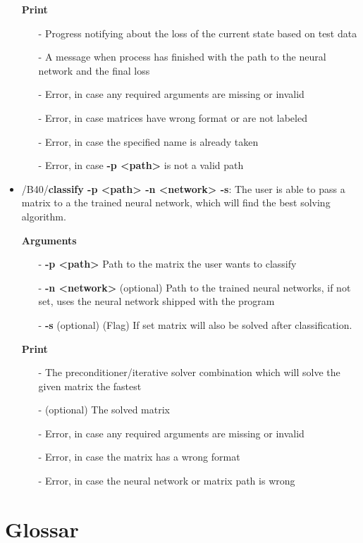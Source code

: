 \documentclass[parskip=full]{scrartcl}
\begin{document}
\begin{itemize}
\textbf{Print}
	\begin{itemize}
	\item[-]Progress notifying about the loss of the current state based on test data
	\item[-]A message when process has finished with the path to the \gls{neural network} and the final loss
	\item[-]Error, in case any required arguments are missing or invalid
	\item[-]Error, in case matrices have wrong format or are not labeled
	\item[-]Error, in case the specified name is already taken
	\item[-]Error, in case \textbf{-p <path>} is not a valid path
	\end{itemize}

\item/B40/\textbf{classify -p <path> -n <network> -s}:
\newline The user is able to pass a matrix to a the trained \gls{neural network}, which will find the best solving algorithm.

\textbf{Arguments}
	\begin{itemize}
	\item[-]\textbf{-p <path>} Path to the matrix the user wants to classify
	\item[-]\textbf{-n <network>} (optional) Path to the trained \glspl{neural network}, if not set, uses the \gls{neural network} shipped with the program
	\item[-]\textbf{-s} (optional) (Flag) If set matrix will also be solved after classification.
	\end{itemize}

\textbf{Print}
	\begin{itemize}
	\item[-]The \gls{preconditioner}/\gls{iterative solver} combination which will solve the given matrix the fastest
	\item[-](optional) The solved matrix
	\item[-]Error, in case any required arguments are missing or invalid
	\item[-]Error, in case the matrix has a wrong format
	\item[-]Error, in case the \gls{neural network} or matrix path is wrong
	\end{itemize}
\end{itemize}
\clearpage

\section{Glossar}

%
\printnoidxglossaries
\end{document}
